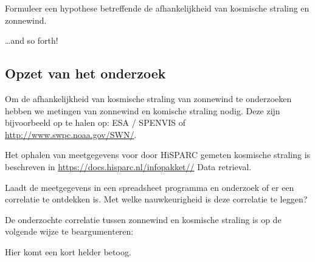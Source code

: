 \begin{questions}

\question Formuleer een hypothese betreffende de afhankelijkheid van
kosmische straling en zonnewind.
\begin{solution}
  \ldots{}and so forth!
\end{solution}


\begin{EnvUplevel}
\section{Opzet van het onderzoek}

Om de afhankelijkheid van kosmische straling van zonnewind te onderzoeken
hebben we metingen van zonnewind en komische straling nodig. Deze zijn
bijvoorbeeld op te halen op: ESA / SPENVIS of
\url{http://www.swpc.noaa.gov/SWN/}.

Het ophalen van meetgegevens voor door HiSPARC gemeten kosmische straling
is beschreven in
\url{https://docs.hisparc.nl/infopakket//} Data
retrieval.

Laadt de meetgegevens in een spreadsheet programma en onderzoek of er een
correlatie te ontdekken is. Met welke nauwkeurigheid is deze correlatie te
leggen?
\end{EnvUplevel}



\question De onderzochte correlatie tussen zonnewind en kosmische straling
is op de volgende wijze te beargumenteren:
\begin{solution}
  Hier komt een kort helder betoog.
\end{solution}


\end{questions}

